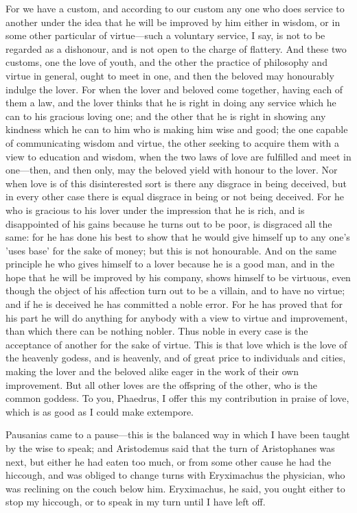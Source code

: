 \para[55] For we have a custom, and according to our custom any one who does service to another under the idea that he will be improved by him either in wisdom, or in some other particular of virtue---such a voluntary service, I say, is not to be regarded as a dishonour, and is not open to the charge of flattery. And these two customs, one the love of youth, and the other the practice of philosophy and virtue in general, ought to meet in one, and then the beloved may honourably indulge the lover. For when the lover and beloved come together, having each of them a law, and the lover thinks that he is right in doing any service which he can to his gracious loving one; and the other that he is right in showing any kindness which he can to him who is making him wise and good; the one capable of communicating wisdom and virtue, the other seeking to acquire them with a view to education and wisdom, when the two laws of love are fulfilled and meet in one---then, and then only, may the beloved yield with honour to the lover. Nor when love is of this disinterested sort is there any disgrace in being deceived, but in every other case there is equal disgrace in being or not being deceived. For he who is gracious to his lover under the impression that he is rich, and is disappointed of his gains because he turns out to be poor, is disgraced all the same: for he has done his best to show that he would give himself up to any one's 'uses base' for the sake of money; but this is not honourable. And on the same principle he who gives himself to a lover because he is a good man, and in the hope that he will be improved by his company, shows himself to be virtuous, even though the object of his affection turn out to be a villain, and to have no virtue; and if he is deceived he has committed a noble error. For he has proved that for his part he will do anything for anybody with a view to virtue and improvement, than which there can be nothing nobler. Thus noble in every case is the acceptance of another for the sake of virtue. This is that love which is the love of the heavenly godess, and is heavenly, and of great price to individuals and cities, making the lover and the beloved alike eager in the work of their own improvement. But all other loves are the offspring of the other, who is the common goddess. To you, Phaedrus, I offer this my contribution in praise of love, which is as good as I could make extempore.

\para[56] Pausanias came to a pause---this is the balanced way in which I have been taught by the wise to speak; and Aristodemus said that the turn of Aristophanes was next, but either he had eaten too much, or from some other cause he had the hiccough, and was obliged to change turns with Eryximachus the physician, who was reclining on the couch below him. Eryximachus, he said, you ought either to stop my hiccough, or to speak in my turn until I have left off.

